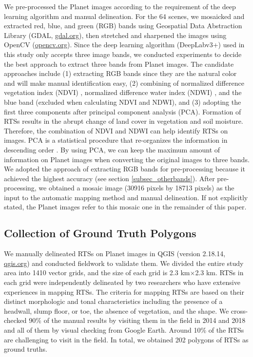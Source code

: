 \documentclass[preprint,12pt,authoryear]{elsarticle}
\begin{document}
We pre-processed the Planet images according to the requirement of the deep learning algorithm and manual delineation. For the 64 scenes, we mosaicked and extracted red, blue, and green (RGB) bands using Geospatial Data Abstraction Library (GDAL, \url{gdal.org}), then stretched and sharpened the images using OpenCV (\url{opencv.org}). Since the deep learning algorithm (DeepLabv3+) used in this study only accepts three image bands, we conducted experiments to decide the best approach to extract three bands from Planet images. The candidate approaches include (1) extracting RGB bands since they are the natural color and will make manual identification easy, (2) combining of normalized difference vegetation index (NDVI) \citep{rouse1974monitoring}, normalized difference water index (NDWI) \citep{mcfeeters1996use}, and the blue band (excluded when calculating NDVI and NDWI), and (3) adopting the first three components after principal component analysis (PCA). Formation of RTSs results in the abrupt change of land cover in vegetation and soil moisture. Therefore, the combination of NDVI and NDWI can help identify RTSs on images. PCA is a statistical procedure that re-organizes the information in descending order \citep{wold1987principal}. By using PCA, we can keep the maximum amount of information on Planet images when converting the original images to three bands. We adopted the approach of extracting RGB bands for pre-processing because it achieved the highest accuracy (see section \ref{subsec_otherbands}). After pre-processing, we obtained a mosaic image (30916 pixels by 18713 pixels) as the input to the automatic mapping method and manual delineation. If not explicitly stated, the Planet images refer to this mosaic one in the remainder of this paper.

\subsection{Collection of Ground Truth Polygons}
\label{subsec_collect_groundtruth}

We manually delineated RTSs on Planet images in QGIS (version 2.18.14, \url{qgis.org}) and conducted fieldwork to validate them. We divided the entire study area into 1410 vector grids, and the size of each grid is 2.3 km$\times$2.3 km. RTSs in each grid were independently delineated by two researchers who have extensive experiences in mapping RTSs. 
The criteria for mapping RTSs are based on their distinct morphologic and tonal characteristics including the presence of a headwall, slump floor, or toe, the absence of vegetation, and the shape. We cross-checked 90\% of the manual results by visiting them in the field in 2014 and 2018 and all of them by visual checking from Google Earth. Around 10\% of the RTSs are challenging to visit in the field. In total, we obtained 202 polygons of RTSs as ground truths.  
\end{document}
